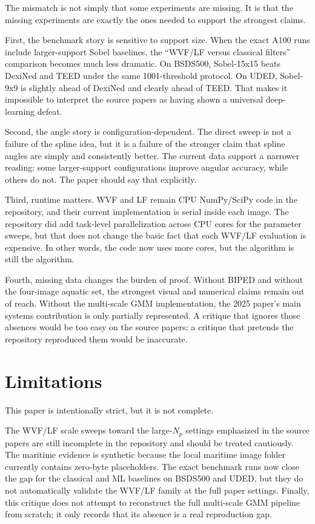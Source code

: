 \documentclass[conference]{IEEEtran}
\begin{document}
The mismatch is not simply that some experiments are missing. It is that the missing experiments are exactly the ones needed to support the strongest claims.

First, the benchmark story is sensitive to support size. When the exact A100 runs include larger-support Sobel baselines, the ``WVF/LF versus classical filters'' comparison becomes much less dramatic. On BSDS500, Sobel-15x15 beats DexiNed and TEED under the same 1001-threshold protocol. On UDED, Sobel-9x9 is slightly ahead of DexiNed and clearly ahead of TEED. That makes it impossible to interpret the source papers as having shown a universal deep-learning defeat.

Second, the angle story is configuration-dependent. The direct sweep is not a failure of the spline idea, but it is a failure of the stronger claim that spline angles are simply and consistently better. The current data support a narrower reading: some larger-support configurations improve angular accuracy, while others do not. The paper should say that explicitly.

Third, runtime matters. WVF and LF remain CPU NumPy/SciPy code in the repository, and their current implementation is serial inside each image. The repository did add task-level parallelization across CPU cores for the parameter sweeps, but that does not change the basic fact that each WVF/LF evaluation is expensive. In other words, the code now uses more cores, but the algorithm is still the algorithm.

Fourth, missing data changes the burden of proof. Without BIPED and without the four-image aquatic set, the strongest visual and numerical claims remain out of reach. Without the multi-scale GMM implementation, the 2025 paper's main systems contribution is only partially represented. A critique that ignores those absences would be too easy on the source papers; a critique that pretends the repository reproduced them would be inaccurate.

\section{Limitations}

This paper is intentionally strict, but it is not complete.

The WVF/LF scale sweeps toward the large-$N_p$ settings emphasized in the source papers are still incomplete in the repository and should be treated cautiously. The maritime evidence is synthetic because the local maritime image folder currently contains zero-byte placeholders. The exact benchmark runs now close the gap for the classical and ML baselines on BSDS500 and UDED, but they do not automatically validate the WVF/LF family at the full paper settings. Finally, this critique does not attempt to reconstruct the full multi-scale GMM pipeline from scratch; it only records that its absence is a real reproduction gap.
\end{document}
